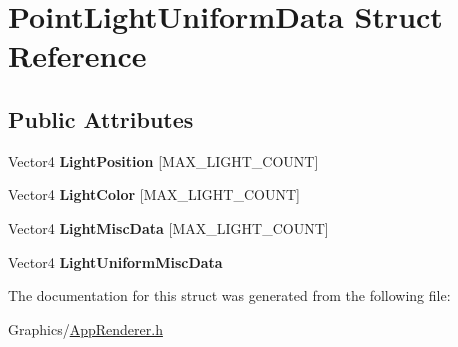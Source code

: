 \hypertarget{structPointLightUniformData}{}\section{Point\+Light\+Uniform\+Data Struct Reference}
\label{structPointLightUniformData}
\subsection*{Public Attributes}
\begin{DoxyCompactItemize}
\item 
\mbox{\label{structPointLightUniformData_a17da3954b568253332a65c5de5955aa5}} 
Vector4 {\bfseries Light\+Position} \mbox{[}M\+A\+X\+\_\+\+L\+I\+G\+H\+T\+\_\+\+C\+O\+U\+NT\mbox{]}
\item 
\mbox{\label{structPointLightUniformData_af98c24ec1d879d1180e1d49feb6c8151}} 
Vector4 {\bfseries Light\+Color} \mbox{[}M\+A\+X\+\_\+\+L\+I\+G\+H\+T\+\_\+\+C\+O\+U\+NT\mbox{]}
\item 
\mbox{\label{structPointLightUniformData_a4c926e8ce4239973eccc1217ff6c7396}} 
Vector4 {\bfseries Light\+Misc\+Data} \mbox{[}M\+A\+X\+\_\+\+L\+I\+G\+H\+T\+\_\+\+C\+O\+U\+NT\mbox{]}
\item 
\mbox{\label{structPointLightUniformData_a88007eb86d151be63b9874c55e7bcb4d}} 
Vector4 {\bfseries Light\+Uniform\+Misc\+Data}
\end{DoxyCompactItemize}


The documentation for this struct was generated from the following file\+:\begin{DoxyCompactItemize}
\item 
Graphics/\hyperlink{AppRenderer_8h}{App\+Renderer.\+h}\end{DoxyCompactItemize}
